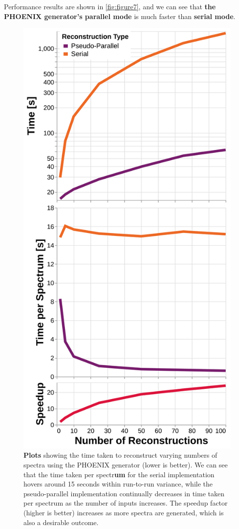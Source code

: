 \documentclass[twocolumn, linenumbers]{aastex631}
\begin{document}
Performance results are shown in \autoref{fig:figure7}, and we can see that \textbf{the PHOENIX generator's parallel mode} is much faster than \textbf{serial mode}.
\begin{figure}[t!]
    \centering
    \includegraphics[width=\columnwidth]{figure7}
    \caption{\textbf{Plots} showing the time taken to reconstruct varying numbers of spectra using the PHOENIX generator (lower is better).
    We can see that the time taken per spectr\textbf{um} for the serial implementation hovers around 15 seconds within run-to-run variance, while the pseudo-parallel implementation continually decreases in time taken per spectrum as the number of inputs increases.
    The speedup factor (higher is better) increases as more spectra are generated, which is also a desirable outcome.}
    \label{fig:figure7}
\end{figure}
\end{document}
